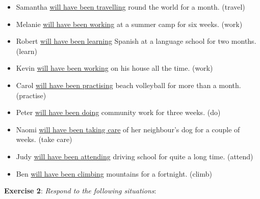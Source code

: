 \begin{itemize}

\item Samantha \underline{will have been travelling} round the world for a month. (travel)
\item Melanie \underline{will have been working} at a summer camp for six weeks. (work)
\item Robert \underline{will have been learning} Spanish at a language school for two months. (learn) 
\item Kevin \underline{will have been working} on his house all the time. (work)
\item Carol \underline{will have been practising} beach volleyball for more than a month. (practise)
\item Peter \underline{will have been doing} community work for three weeks. (do)
\item Naomi \underline{will have been taking care} of her neighbour's dog for a couple of weeks. (take care)
\item Judy \underline{will have been attending} driving school for quite a long time. (attend)
\item Ben \underline{will have been climbing} mountains for a fortnight. (climb)

\end{itemize}

\textbf{Exercise 2}: \textit{Respond to the following situations}:

